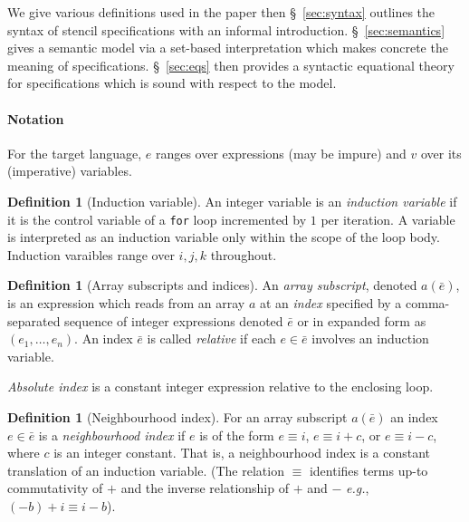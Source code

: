 \documentclass[10pt,preprint]{sigplanconf}
\newcounter{block}
\theoremstyle{definition}
\newtheorem{definition}[block]{Definition}
\newcommand{\eg}{\emph{e.g.}}
\begin{document}
We give various definitions used in the paper then
\S~\ref{sec:syntax} outlines the syntax of stencil specifications
with an informal introduction. \S~\ref{sec:semantics}
gives a semantic model via a set-based interpretation which makes
concrete the meaning of specifications. \S~\ref{sec:eqs} then provides
a syntactic equational theory for specifications which is
sound with respect to the model.


\paragraph{Notation}

\renewcommand*{\arraystretch}{0.8}
For the target language, $e$ ranges over expressions (may be impure) and $v$
over its (imperative) variables. %

\begin{definition}[Induction variable]
  An integer variable is an \emph{induction variable} if it is the control
  variable of a \texttt{for} loop incremented by $1$ per iteration. A variable
  is interpreted as an induction variable only within the scope of the loop
  body. Induction varaibles range over $i, j, k$ throughout.
\end{definition}

\begin{definition}[Array subscripts and indices]
  An \emph{array subscript}, denoted $a(\bar{e})$, is an expression
  which reads from an array $a$ at an \emph{index} specified by a
  comma-separated sequence of integer expressions denoted $\bar{e}$ or
  in expanded form as $(e_1, \ldots, e_n)$. An index $\bar{e}$
  is called \emph{relative} if each $e \in \bar{e}$ involves an induction
  variable.

  \emph{Absolute index} is a constant integer expression relative to the
  enclosing loop.
\end{definition}

\begin{definition}[Neighbourhood index]
\label{def:neighbour}
  For an array subscript $a(\bar{e})$ an index $e \in \bar{e}$ is a
  \emph{neighbourhood index} if $e$ is of the form $e \equiv i$, $e \equiv i +
  c$, or $e \equiv i - c$, where $c$ is an integer constant. That is, a
  neighbourhood index is a constant translation of an induction variable. (The
  relation $\equiv$ identifies terms up-to commutativity of $+$ and the inverse
  relationship of $+$ and $-$ \eg{}, $(-b) + i \equiv i - b$).
\end{definition}
\end{document}
